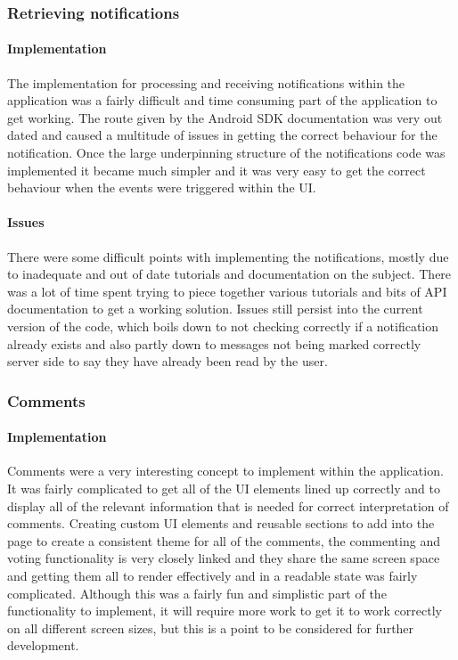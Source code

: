 \subsubsection*{Retrieving notifications}

\paragraph*{Implementation}

The implementation for processing and receiving notifications within the application was a fairly difficult and time consuming part of the application to get working. The route given by the Android SDK documentation was very out dated and caused a multitude of issues in getting the correct behaviour for the notification. Once the large underpinning structure of the notifications code was implemented it became much simpler and it was very easy to get the correct behaviour when the events were triggered within the UI.

\paragraph*{Issues}

There were some difficult points with implementing the notifications, mostly due to inadequate and out of date tutorials and documentation on the subject. There was a lot of time spent trying to piece together various tutorials and bits of API documentation to get a working solution. Issues still persist into the current version of the code, which boils down to not checking correctly if a notification already exists and also partly down to messages not being marked correctly server side to say they have already been read by the user.

\subsubsection*{Comments}

\paragraph*{Implementation}

Comments were a very interesting concept to implement within the application. It was fairly complicated to get all of the UI elements lined up correctly and to display all of the relevant information that is needed for correct interpretation of comments. Creating custom UI elements and reusable sections to add into the page to create a consistent theme for all of the comments, the commenting and voting functionality is very closely linked and they share the same screen space and getting them all to render effectively and in a readable state was fairly complicated. Although this was a fairly fun and simplistic part of the functionality to implement, it will require more work to get it to work correctly on all different screen sizes, but this is a point to be considered for further development.

